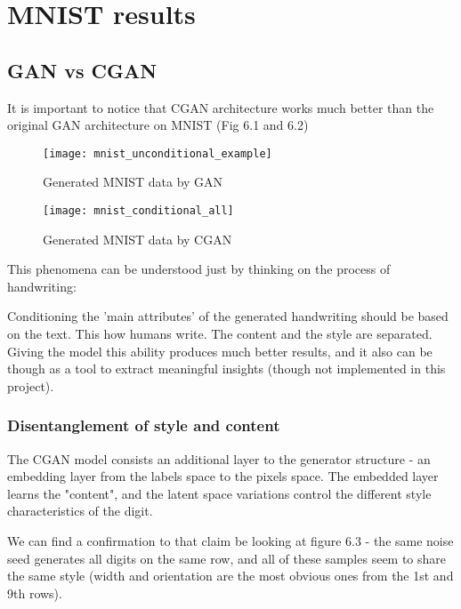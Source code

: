 

\section{MNIST results}


\subsection{GAN vs CGAN}

It is important to notice that CGAN architecture works much better than the original GAN architecture on MNIST (Fig 6.1 and 6.2)


\begin{figure}[!tbp]
  \centering
  \begin{minipage}[b]{0.45\textwidth}
    \texttt{[image: mnist\_unconditional\_example]}
    \caption{Generated MNIST data by GAN}
  \end{minipage}
  \hfill
  \begin{minipage}[b]{0.45\textwidth}
    \texttt{[image: mnist\_conditional\_all]}
    \caption{Generated MNIST data by CGAN}
  \end{minipage}
\end{figure}


This phenomena can be understood just by thinking on the process of handwriting: 

Conditioning the 'main attributes' of the generated handwriting should be based on the text. This how humans write. The content and the style are separated. Giving the model this ability produces much better results, and it also can be though as a tool to extract meaningful insights (though not implemented in this project).


\subsubsection{Disentanglement of style and content}
The CGAN model consists an additional layer to the generator structure - an embedding layer from the labels space to the pixels space.
The embedded layer learns the "content", and the latent space variations control the different style characteristics of the digit. 

We can find a confirmation to that claim be looking at figure 6.3 - the same noise seed generates all digits on the same row, and all of these samples seem to share the same style (width and orientation are the most obvious ones from the 1st and 9th rows).


